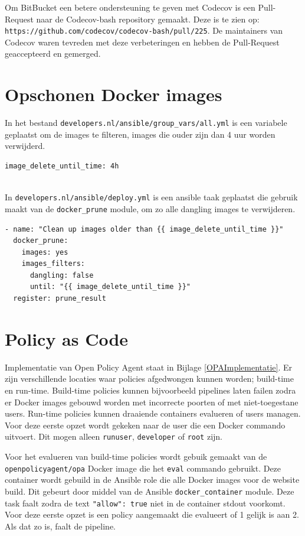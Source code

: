 Om BitBucket een betere ondersteuning te geven met Codecov is een Pull-Request naar de Codecov-bash repository gemaakt. Deze is te zien op:\\ \texttt{https://github.com/codecov/codecov-bash/pull/225}. De maintainers van Codecov waren tevreden met deze verbeteringen en hebben de Pull-Request geaccepteerd en gemerged.

\section{Opschonen Docker images}
In het bestand \texttt{developers.nl/ansible/group\_vars/all.yml} is een variabele geplaatst om de images te filteren, images die ouder zijn dan 4 uur worden verwijderd.
\begin{verbatim}
image_delete_until_time: 4h
\end{verbatim}
\\In \texttt{developers.nl/ansible/deploy.yml} is een ansible taak geplaatst die gebruik maakt van de \texttt{docker\_prune} module, om zo alle dangling images te verwijderen.
\begin{verbatim}
- name: "Clean up images older than {{ image_delete_until_time }}"
  docker_prune:
    images: yes
    images_filters:
      dangling: false
      until: "{{ image_delete_until_time }}"
  register: prune_result
\end{verbatim}

\section{Policy as Code}

Implementatie van Open Policy Agent staat in Bijlage \ref{OPAImplementatie}. Er zijn verschillende locaties waar policies afgedwongen kunnen worden; build-time en run-time. Build-time policies kunnen bijvoorbeeld pipelines laten failen zodra er Docker images gebouwd worden met incorrecte poorten of met niet-toegestane users. Run-time policies kunnen draaiende containers evalueren of users managen. Voor deze eerste opzet wordt gekeken naar de user die een Docker commando uitvoert. Dit mogen alleen \texttt{runuser}, \texttt{developer} of \texttt{root} zijn. 

Voor het evalueren van build-time policies wordt gebuik gemaakt van de \texttt{openpolicyagent/opa} Docker image die het \texttt{eval} commando gebruikt. Deze container wordt gebuild in de Ansible role die alle Docker images voor de website build. Dit gebeurt door middel van de Ansible \texttt{docker\_container} module. Deze task faalt zodra de text \texttt{"allow": true} niet in de container stdout voorkomt. Voor deze eerste opzet is een policy aangemaakt die evalueert of 1 gelijk is aan 2. Als dat zo is, faalt de pipeline.

